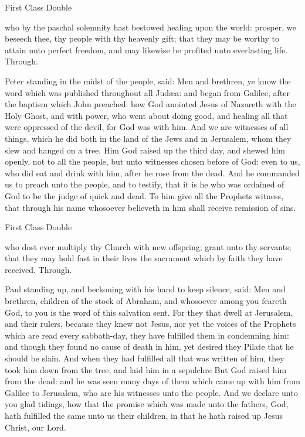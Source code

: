 \begin{inhead}
    {First Class Double}
\end{inhead}

\collect
{} who by the paschal solemnity hast bestowed healing upon the world: prosper, we beseech thee, thy people with thy heavenly gift; that they may be worthy to attain unto perfect freedom, and may likewise be profited unto everlasting life. Through.

 Peter standing in the midst of the people, said: Men and brethren, ye know the word which was published throughout all Jud{\ae}a: and began from Galilee, after the baptism which John preached: how God anointed Jesus of Nazareth with the Holy Ghost, and with power, who went about doing good, and healing all that were oppressed of the devil, for God was with him. And we are witnesses of all things, which he did both in the land of the Jews and in Jerusalem, whom they slew and hanged on a tree. Him God raised up the third day, and shewed him openly, not to all the people, but unto witnesses chosen before of God: even to us, who did eat and drink with him, after he rose from the dead. And he commanded us to preach unto the people, and to testify, that it is he who was ordained of God to be the judge of quick and dead. To him give all the Prophets witness, that through his name whosoever believeth in him shall receive remission of sins.

\begin{inhead}
    {First Class Double}
\end{inhead}

\collect
{} who dost ever multiply thy Church with new offspring; grant unto thy servants; that they may hold fast in their lives the sacrament which by faith they have received. Through.

 Paul standing up, and beckoning with his hand to keep silence, said: Men and brethren, children of the stock of Abraham, and whosoever among you feareth God, to you is the word of this salvation sent. For they that dwell at Jerusalem, and their rulers, because they knew not Jesus, nor yet the voices of the Prophets which are read every sabbath-day, they have fulfilled them in condemning him: and though they found no cause of death in him, yet desired they Pilate that he should be slain. And when they had fulfilled all that was written of him, they took him down from the tree, and laid him in a sepulchre But God raised him from the dead: and he was seen many days of them which came up with him from Galilee to Jerusalem, who are his witnesses unto the people. And we declare unto you glad tidings, how that the promise which was made unto the fathers, God, hath fulfilled the same unto us their children, in that he hath raised up Jesus Christ, our Lord.

